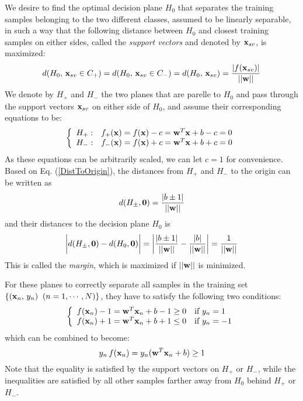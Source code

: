 \documentclass{article}
\begin{document}
We desire to find the optimal decision plane $H_0$ that separates the 
training samples belonging to the two different classes, assumed to be 
linearly separable, in such a way that the following distance between 
$H_0$ and closest training samples on either sides, called the 
{\em support vectors} and denoted by ${\bf x}_{sv}$, is maximized:
\begin{equation}
  d(H_0,\,{\bf x}_{sv}\in C_+)=d(H_0,\,{\bf x}_{sv}\in C_-)
  =d(H_0,\,{\bf x}_{sv})=\frac{|f({\bf x}_{sv})|}{||{\bf w}||}
\end{equation}
We denote by $H_+$ and $H_-$ the two planes that are parelle to $H_0$ 
and pass through the support vectors ${\bf x}_{sv}$ on either side 
of $H_0$, and assume their corresponding equations to be:
\begin{equation}
  \left\{\begin{array}{ll}
  H_+: & f_+({\bf x})=f({\bf x})-c={\bf w}^T {\bf x}+b-c=0 \\ 
  H_-: & f_-({\bf x})=f({\bf x})+c={\bf w}^T {\bf x}+b+c=0
  \end{array}\right.
  \label{SVMplanes}
\end{equation}
As these equations can be arbitrarily scaled, we can let $c=1$ for 
convenience. Based on Eq. (\ref{DistToOrigin}), the distances from 
$H_+$ and $H_-$ to the origin can be written as 
\begin{equation}
  d(H_{\pm},{\bf 0})=\frac{|b\pm 1|}{||{\bf w}||}
\end{equation}
and their distances to the decision plane $H_0$ is
\begin{equation}
  \bigg| d(H_\pm,{\bf 0})-d(H_0,{\bf 0}) \bigg|
  =\bigg| \frac{|b\pm 1|}{||{\bf w}||}-\frac{|b|}{||{\bf w}||} \bigg|
      =\frac{1}{||{\bf w}||}
\end{equation}
This is called the {\em margin}, which is maximized if $||{\bf w}||$ 
is minimized. 

For these planes to correctly separate all samples in the training set 
$\{({\bf x}_n,\,y_n)\;\;(n=1,\cdots,N)\}$, they have to satisfy the 
following two conditions:
\begin{equation}
  \left\{\begin{array}{ll}
  f({\bf x}_n)-1={\bf w}^T {\bf x}_n+b-1 \ge 0 & \mbox{if $y_n=1$}\\
  f({\bf x}_n)+1={\bf w}^T {\bf x}_n+b+1 \le 0 & \mbox{if $y_n=-1$}
  \end{array}\right.
\end{equation}
which can be combined to become:
\begin{equation}
  y_n\,f({\bf x}_n)=y_n ({\bf w}^T{\bf x}_n +b) \ge 1
  \label{SVMcondition}
\end{equation}
Note that the equality is satisfied by the support vectors on $H_+$ 
or $H_-$, while the inequalities are satisfied by all other samples 
farther away from $H_0$ behind $H_+$ or $H_-$. 
\end{document}
